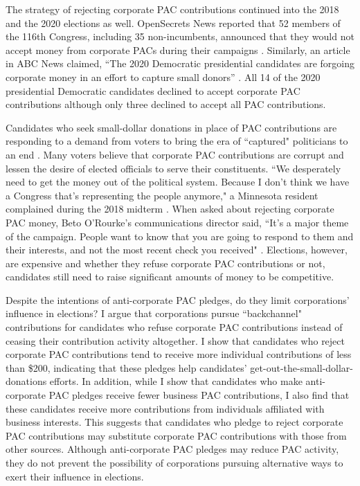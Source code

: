 \documentclass[12pt]{article}
\begin{document}
The strategy of rejecting corporate PAC contributions continued into the 2018 and the 2020 elections as well. OpenSecrets News reported that 52 members of the 116th Congress, including 35 non-incumbents, announced that they would not accept money from corporate PACs during their campaigns \citep{evers-hillstrom2018}. Similarly, an article in ABC News claimed, ``The 2020 Democratic presidential candidates are forgoing corporate money in an effort to capture small donors'' \citep{harper2019}. All 14 of the 2020 presidential Democratic candidates declined to accept corporate PAC contributions although only three declined to accept all PAC contributions. 

Candidates who seek small-dollar donations in place of PAC contributions are responding to a demand from voters to bring the era of ``captured" politicians to an end \citep{culberson2019}. Many voters believe that corporate PAC contributions are corrupt and lessen the desire of elected officials to serve their constituents. ``We desperately need to get the money out of the political system. Because I don’t think we have a Congress that’s representing the people anymore," a Minnesota resident complained during the 2018 midterm \citep{stockman2018}. When asked about rejecting corporate PAC money, Beto O’Rourke's communications director said, ``It’s a major theme of the campaign. People want to know that you are going to respond to them and their interests, and not the most recent check you received" \citep{stockman2018}. Elections, however, are expensive and whether they refuse corporate PAC contributions or not, candidates still need to raise significant amounts of money to be competitive.

Despite the intentions of anti-corporate PAC pledges, do they limit corporations' influence in elections? I argue that corporations pursue ``backchannel" contributions for candidates who refuse corporate PAC contributions instead of ceasing their contribution activity altogether. I show that candidates who reject corporate PAC contributions tend to receive more individual contributions of less than \$200, indicating that these pledges help candidates' get-out-the-small-dollar-donations efforts. In addition, while I show that candidates who make anti-corporate PAC pledges receive fewer business PAC contributions, I also find that these candidates receive more contributions from individuals affiliated with business interests. This suggests that candidates who pledge to reject corporate PAC contributions may substitute corporate PAC contributions with those from other sources. Although anti-corporate PAC pledges may reduce PAC activity, they do not prevent the possibility of corporations pursuing alternative ways to exert their influence in elections. 
\end{document}
